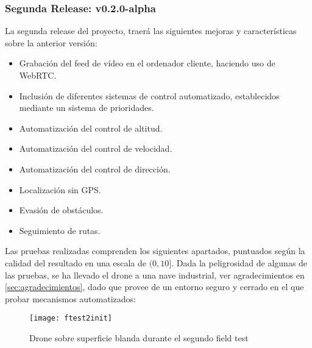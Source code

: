 \subsubsection{Segunda Release: v0.2.0-alpha}
\label{subsec:fieldTestingv2}

La segunda release del proyecto, traerá las siguientes mejoras y características sobre la anterior versión:
\begin{itemize}
\item Grabación del feed de vídeo en el ordenador cliente, haciendo uso de WebRTC.
\item Inclusión de diferentes sistemas de control automatizado, establecidos mediante un sistema de prioridades.
\item Automatización del control de altitud.
\item Automatización del control de velocidad.
\item Automatización del control de dirección.
\item Localización sin GPS.
\item Evasión de obstáculos.
\item Seguimiento de rutas.
\end{itemize}

Las pruebas realizadas comprenden los siguientes apartados, puntuados según la calidad del resultado en una escala de $(0, 10]$. Dada la peligrosidad de algunas de las pruebas, se ha llevado el drone a una nave industrial, ver agradecimientos en \ref{sec:agradecimientos}, dado que provee de un entorno seguro y cerrado en el que probar mecanismos automatizados:
\begin{figure}[H]
	\centering
	\texttt{[image: ftest2init]}
	\caption[Field Test 2. Nave industrial]{Drone sobre superficie blanda durante el segundo field test}\label{fig:ftest2init}
\end{figure}

